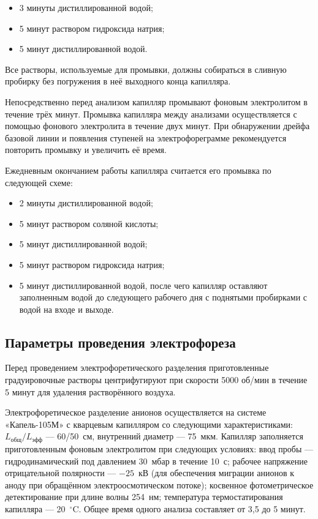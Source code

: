 \begin{itemize}
	\item 3 минуты дистиллированной водой;
	\item 5 минут раствором гидроксида натрия;
	\item 5 минут дистиллированной водой.
\end{itemize}

Все растворы, используемые для промывки, должны собираться в сливную пробирку без погружения в неё выходного конца капилляра.

Непосредственно перед анализом капилляр промывают фоновым электролитом в течение трёх минут. Промывка капилляра между анализами осуществляется с помощью фонового электролита в течение двух минут. При обнаружении дрейфа базовой линии и появления ступеней на электрофореграмме рекомендуется повторить промывку и увеличить её время.

Ежедневным окончанием работы капилляра считается его промывка по следующей схеме:

\begin{itemize}
	\item 2 минуты дистиллированной водой;
	\item 5 минут раствором соляной кислоты;
	\item 5 минут дистиллированной водой;
	\item 5 минут раствором гидроксида натрия;
	\item 5 минут дистиллированной водой, после чего капилляр оставляют заполненным водой до следующего рабочего дня с поднятыми пробирками с водой на входе и выходе.
\end{itemize}

\subsection{Параметры проведения электрофореза}

Перед проведением электрофоретического разделения приготовленные градуировочные растворы центрифугируют при скорости 5000 об/мин в течение 5 минут для удаления растворённого воздуха.

Электрофоретическое разделение анионов осуществляется на системе «Капель-105М» с кварцевым капилляром со следующими характеристиками: $L_{\text{общ}}/L_{\text{эфф}}$ — 60/50~см, внутренний диаметр — 75~мкм. Капилляр заполняется приготовленным фоновым электролитом при следующих условиях: ввод пробы — гидродинамический под давлением 30~мбар в течение 10~с; рабочее напряжение отрицательной полярности — $-25$~кВ (для обеспечения миграции анионов к аноду при обращённом электроосмотическом потоке); косвенное фотометрическое детектирование при длине волны 254~нм; температура термостатирования капилляра — 20~$^\circ$C. Общее время одного анализа составляет от 3,5 до 5 минут.

